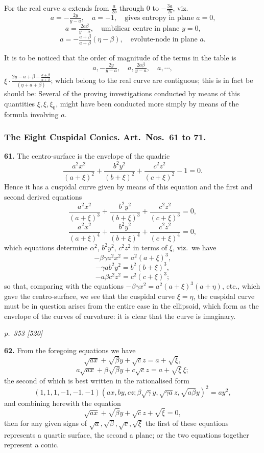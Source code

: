 \documentclass[11pt,a4paper]{book}
\begin{document}
For the real curve $a$ extends from $\tfrac{a}{2b}$ through 0 to $-\tfrac{3a}{2b}$, viz.
\[
a = -\tfrac{2y}{y - a},\quad a = -1,\quad \text{gives entropy in plane $a = 0$,}
\]
\[
a = \tfrac{2a\beta}{y - a},\quad \text{umbilicar centre in plane $y = 0$,}
\]
\[
a = -\tfrac{a + \beta}{a + \beta}(\eta - \beta),\quad \text{evolute-node in plane $a$.}
\]

It is to be noticed that the order of magnitude of the terms in the table is
\[
a, -\tfrac{2y}{y - a},\quad a, \tfrac{2a\beta}{y - a},\quad a, \cdots,
\]
$\xi \cdot \tfrac{2y - a + \beta - \tfrac{a + \beta}{a + \beta}}{(\eta + a + \beta)}$; which belong to the real curve are contiguous; this is in fact be should be: Several of the proving investigations conducted by means of this quantities $\xi, \xi, \xi_0$, might have been conducted more simply by means of the formula involving $a$.

\subsubsection*{The Eight Cuspidal Conics. Art.\ Nos.\ 61 to 71.}

\textbf{61.} The centro-surface is the envelope of the quadric
\[
\frac{a^2 x^2}{(a + \xi)^2} + \frac{b^2 y^2}{(b + \xi)^2} + \frac{c^2 z^2}{(c + \xi)^2} - 1 = 0.
\]
Hence it has a cuspidal curve given by means of this equation and the first and second derived equations
\[
\frac{a^2 x^2}{(a + \xi)^3} + \frac{b^2 y^2}{(b + \xi)^3} + \frac{c^2 z^2}{(c + \xi)^3} = 0,
\]
\[
\frac{a^2 x^2}{(a + \xi)^4} + \frac{b^2 y^2}{(b + \xi)^4} + \frac{c^2 z^2}{(c + \xi)^4} = 0,
\]
which equations determine $\alpha^2$, $b^2 y^2$, $c^2 z^2$ in terms of $\xi$, viz.\ we have
\[
-\beta\gamma a^2 x^2 = a^2(a + \xi)^3,
\]
\[
-\gamma a b^2 y^2 = b^2(b + \xi)^3,
\]
\[
-a\beta c^2 z^2 = c^2(c + \xi)^3;
\]
so that, comparing with the equations $-\beta\gamma x^2 = a^2(a + \xi)^3(a + \eta)$, etc., which gave the centro-surface, we see that the cuspidal curve $\xi = \eta$, the cuspidal curve must be in question arises from the entire case in the ellipsoid, which form as the envelope of the curves of curvature: it is clear that the curve is imaginary.

\clearpage

\bigskip
\textit{p.~353 [520]}
\smallskip

\textbf{62.} From the foregoing equations we have
\[
\sqrt{a x} + \sqrt{\beta}y + \sqrt{c}z = a + \sqrt{\xi},
\]
\[
a\sqrt{a x} + \beta\sqrt{\beta}y + c\sqrt{c}z = a + \sqrt{\xi}\,\xi;
\]
the second of which is best written in the rationalised form
\[
(1, 1, 1, -1, -1, -1)(a x, b y, c z; \beta\sqrt{\gamma}y, \sqrt{\gamma a}z, \sqrt{a\beta}y)^2 = a y^2,
\]
and combining herewith the equation
\[
\sqrt{a x} + \sqrt{\beta}y + \sqrt{c}z + \sqrt{\xi} = 0,
\]
then for any given signs of $\sqrt{a}, \sqrt{\beta}, \sqrt{c}, \sqrt{\xi}$ the first of these equations represents a quartic surface, the second a plane; or the two equations together represent a conic.
\end{document}
